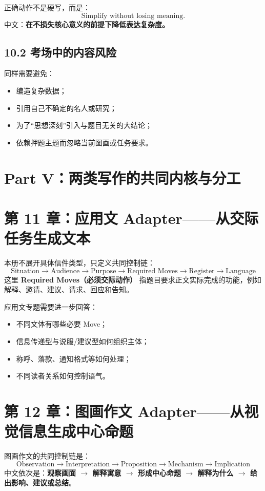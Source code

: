 \documentclass[11pt,a4paper]{ctexart}
\newcommand{\kw}[1]{\textbf{#1}}
\newcommand{\term}[2]{\textbf{#1（#2）}}
\begin{document}
正确动作不是硬写，而是：
\[
\boxed{
\text{Simplify without losing meaning.}
}
\]
中文：\kw{在不损失核心意义的前提下降低表达复杂度。}

\subsection{10.2 考场中的内容风险}
同样需要避免：
\begin{itemize}
  \item 编造复杂数据；
  \item 引用自己不确定的名人或研究；
  \item 为了“思想深刻”引入与题目无关的大结论；
  \item 依赖押题主题而忽略当前图画或任务要求。
\end{itemize}

\newpage
\section{Part V：两类写作的共同内核与分工}

\section{第 11 章：应用文 Adapter——从交际任务生成文本}

本册不展开具体信件类型，只定义共同控制链：
\[
\boxed{
\text{Situation}
\rightarrow
\text{Audience}
\rightarrow
\text{Purpose}
\rightarrow
\text{Required Moves}
\rightarrow
\text{Register}
\rightarrow
\text{Language}
}
\]
这里 \term{Required Moves}{必须交际动作} 指题目要求正文实际完成的功能，例如解释、邀请、建议、请求、回应和告知。

应用文专题需要进一步回答：
\begin{itemize}
  \item 不同文体有哪些必要 Move；
  \item 信息传递型与说服/建议型如何组织主体；
  \item 称呼、落款、通知格式等如何处理；
  \item 不同读者关系如何控制语气。
\end{itemize}

\section{第 12 章：图画作文 Adapter——从视觉信息生成中心命题}

图画作文的共同控制链是：
\[
\boxed{
\text{Observation}
\rightarrow
\text{Interpretation}
\rightarrow
\text{Proposition}
\rightarrow
\text{Mechanism}
\rightarrow
\text{Implication}
}
\]
中文依次是：\kw{观察画面 $\rightarrow$ 解释寓意 $\rightarrow$ 形成中心命题 $\rightarrow$ 解释为什么 $\rightarrow$ 给出影响、建议或总结}。
\end{document}
